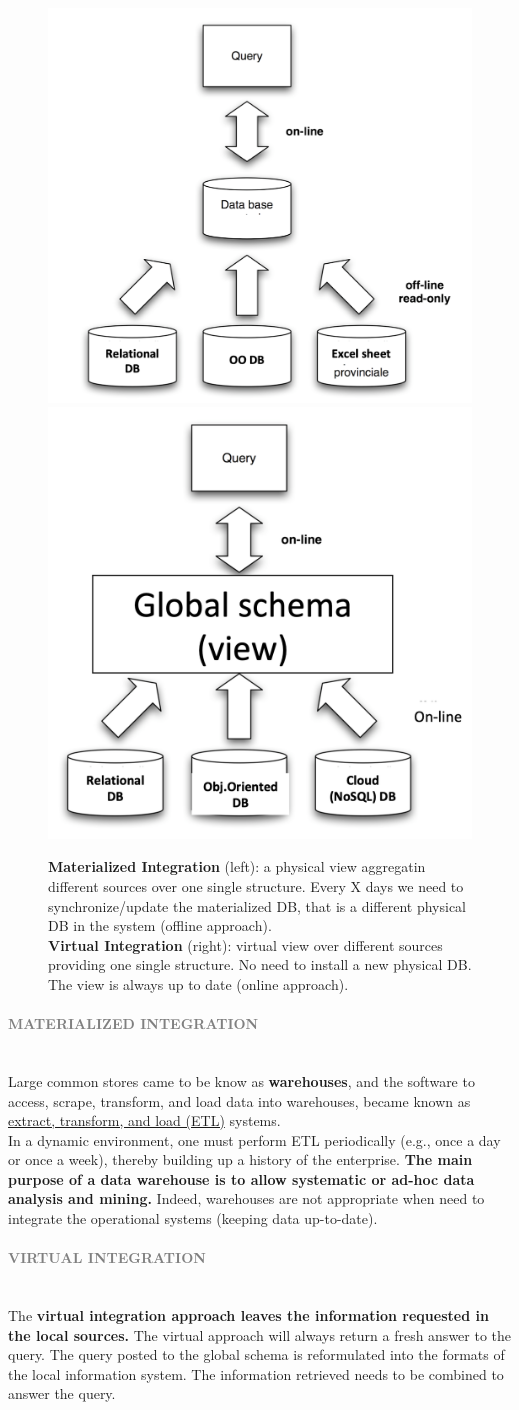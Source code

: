\documentclass[10pt,a4paper]{article}
\newcommand{\myparagraph}[1]{\paragraph{\normalsize{\textcolor{gray}{\uppercase{\textbf{#1}}}} }\mbox{} \vspace{0.5em}\\}
\begin{document}
\begin{figure}[htp]
\centering
\includegraphics[width=.4\textwidth]{images/materialized-integration}\hfill
\includegraphics[width=.4\textwidth]{images/virtual-integration}\hfill
\caption{\textbf{Materialized Integration} (left): a physical view aggregatin different sources over one single structure. Every X days we need to synchronize/update the materialized DB, that is a different physical DB in the system (offline approach). \\
\textbf{Virtual Integration} (right): virtual view over different sources providing one single structure. No need to install a new physical DB. The view is always up to date (online approach).}
\end{figure}
\raggedright
\myparagraph{Materialized Integration}
Large common stores came to be know as \textbf{warehouses}, and the software to access, scrape, transform, and load data into warehouses, became known as \uline{extract, transform, and load (ETL)} systems. \\ In a dynamic environment, one must perform ETL periodically (e.g., once a day or once a week), thereby building up a history of the enterprise. \textbf{The main purpose of a data warehouse is to allow systematic or ad-hoc data analysis and mining.} Indeed, warehouses are not appropriate when need to integrate the operational systems (keeping data up-to-date).
\myparagraph{Virtual Integration}
The \textbf{virtual integration approach leaves the information requested in the local sources.} The virtual approach will always return a fresh answer to the query. The query posted to the global schema is reformulated into the formats of the local information system. The information retrieved needs to be combined to answer the query.
\end{document}
